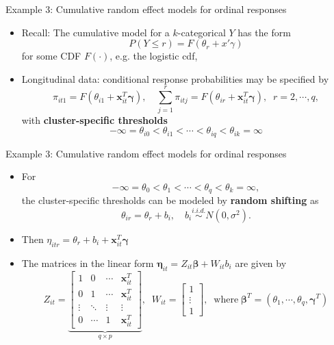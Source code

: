 \documentclass{beamer}
\newcommand{\boldbeta}{{\boldsymbol \beta}}
\newcommand{\boldeta}{{\boldsymbol \eta}}
\newcommand{\boldgamma}{{\boldsymbol \gamma}}
\begin{document}
\begin{frame}{Example 3: Cumulative  random effect models for ordinal responses}
\begin{itemize}
\item Recall:  The cumulative model for a $k$-categorical $Y$ has the form
\[
P(Y \leq r ) = F(\theta_r + x'\gamma)
\]
for some CDF $F(\cdot)$, e.g. the logistic cdf,

\item
Longitudinal data: conditional response probabilities may be specified by
$$\pi_{it1}=F(\theta_{i1}+\mathbf{x}_{it}^T\boldgamma), \quad
  \sum_{j=1}^r\pi_{itj}=F(\theta_{ir}+\mathbf{x}_{it}^T\boldgamma), \;\; r=2,\cdots, q,$$
with \textbf{cluster-specific thresholds} 
\begin{equation}
-\infty=\theta_{i0}<\theta_{i1}<\cdots < \theta_{iq}<\theta_{ik}=\infty
\label{eq-7.2.6}
\end{equation}

\end{itemize}

\end{frame}





\begin{frame}{Example 3: Cumulative  random effect models for ordinal responses}
\begin{itemize}
\item For 
\[
-\infty=\theta_{0}<\theta_{1}<\cdots < \theta_{q}<\theta_{k}=\infty,
\]
the cluster-specific thresholds can be modeled by {\bf random shifting} as 
$$\theta_{ir}=\theta_r+b_i, \quad b_i\stackrel{i.i.d.}{\sim} N(0,\sigma^2).$$
\item
Then $\eta_{itr}=\theta_r+b_i+\mathbf{x}_{it}^T\boldgamma$
\item
The matrices in the linear form $\boldeta_{it}=Z_{it}\boldbeta
+W_{it} b_i$ are given by
$$Z_{it}\!\!=\!\! \underbrace{\left[\begin{array}{cccc}1 & 0 & \cdots &\mathbf{x}_{it}^T \\ 0 & 1 & \cdots & \mathbf{x}_{it}^T \\
\vdots & \ddots & \vdots & \vdots \\ 0 & \cdots & 1 & \mathbf{x}_{it}^T\end{array}\right]}_{q \times p }, \;\;
W_{it}\!\!=\!\!\left[\begin{array}{c}1 \\ \vdots \\ 1\end{array}\right], \;\; \mbox{where}\;
\boldbeta^T\!\!=\!(\theta_1,\cdots, \theta_q, \boldgamma^T)$$
\end{itemize}
\end{frame}
\end{document}
